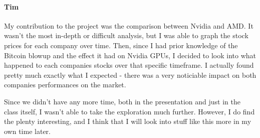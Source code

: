 \documentclass[]{article}
\let\oldparagraph\paragraph
\renewcommand{\paragraph}[1]{\oldparagraph{#1}\mbox{}}
\begin{document}
\hypertarget{tim}{%
\paragraph{Tim}\label{tim}}

My contribution to the project was the comparison between Nvidia and
AMD. It wasn't the most in-depth or difficult analysis, but I was able
to graph the stock prices for each company over time. Then, since I had
prior knowledge of the Bitcoin blowup and the effect it had on Nvidia
GPUs, I decided to look into what happened to each companies stocks over
that specific timeframe. I actually found pretty much exactly what I
expected - there was a very noticiable impact on both companies
performances on the market.

Since we didn't have any more time, both in the presentation and just in
the class itself, I wasn't able to take the exploration much further.
However, I do find the plenty interesting, and I think that I will look
into stuff like this more in my own time later.
\end{document}
